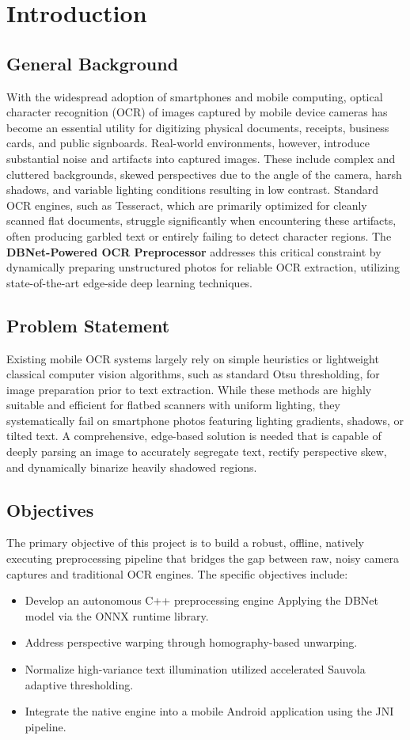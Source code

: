 \chapter{Introduction}
\section{General Background}
With the widespread adoption of smartphones and mobile computing, optical character recognition (OCR) of images captured by mobile device cameras has become an essential utility for digitizing physical documents, receipts, business cards, and public signboards. Real-world environments, however, introduce substantial noise and artifacts into captured images. These include complex and cluttered backgrounds, skewed perspectives due to the angle of the camera, harsh shadows, and variable lighting conditions resulting in low contrast. Standard OCR engines, such as Tesseract, which are primarily optimized for cleanly scanned flat documents, struggle significantly when encountering these artifacts, often producing garbled text or entirely failing to detect character regions. The \textbf{DBNet-Powered OCR Preprocessor} addresses this critical constraint by dynamically preparing unstructured photos for reliable OCR extraction, utilizing state-of-the-art edge-side deep learning techniques. 

\section{Problem Statement}
Existing mobile OCR systems largely rely on simple heuristics or lightweight classical computer vision algorithms, such as standard Otsu thresholding, for image preparation prior to text extraction. While these methods are highly suitable and efficient for flatbed scanners with uniform lighting, they systematically fail on smartphone photos featuring lighting gradients, shadows, or tilted text. A comprehensive, edge-based solution is needed that is capable of deeply parsing an image to accurately segregate text, rectify perspective skew, and dynamically binarize heavily shadowed regions. 

\section{Objectives}
The primary objective of this project is to build a robust, offline, natively executing preprocessing pipeline that bridges the gap between raw, noisy camera captures and traditional OCR engines. The specific objectives include:
\begin{itemize}
    \item Develop an autonomous C++ preprocessing engine Applying the DBNet model via the ONNX runtime library.
    \item Address perspective warping through homography-based unwarping.
    \item Normalize high-variance text illumination utilized accelerated Sauvola adaptive thresholding.
    \item Integrate the native engine into a mobile Android application using the JNI pipeline.
\end{itemize}
